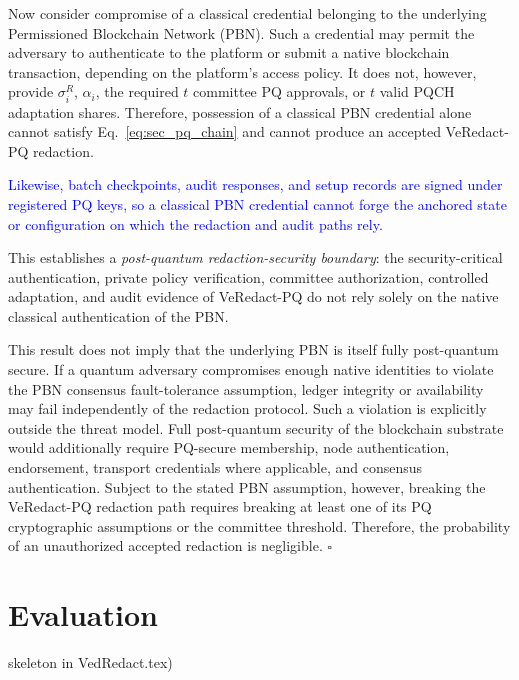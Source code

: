 \documentclass[lettersize,journal]{IEEEtran}
\begin{document}
Now consider compromise of a classical credential belonging to the
underlying Permissioned Blockchain Network (PBN). Such a credential
may permit the adversary to authenticate to the platform or submit a
native blockchain transaction, depending on the platform's access
policy. It does not, however, provide $\sigma_i^R$, $\alpha_i$, the
required $t$ committee PQ approvals, or $t$ valid PQCH adaptation
shares. Therefore, possession of a classical PBN credential alone
cannot satisfy Eq.~\eqref{eq:sec_pq_chain} and cannot produce an
accepted VeRedact-PQ redaction.

\textcolor{blue}{Likewise, batch checkpoints, audit responses, and setup
records are signed under registered PQ keys, so a classical PBN
credential cannot forge the anchored state or configuration on which
the redaction and audit paths rely.}

This establishes a \emph{post-quantum redaction-security boundary}:
the security-critical authentication, private policy verification,
committee authorization, controlled adaptation, and audit evidence
of VeRedact-PQ do not rely solely on the native classical
authentication of the PBN.

This result does not imply that the underlying PBN is itself fully
post-quantum secure. If a quantum adversary compromises enough native
identities to violate the PBN consensus fault-tolerance assumption,
ledger integrity or availability may fail independently of the
redaction protocol. Such a violation is explicitly outside the threat
model. Full post-quantum security of the blockchain substrate would
additionally require PQ-secure membership, node authentication,
endorsement, transport credentials where applicable, and consensus
authentication. Subject to the stated PBN assumption, however,
breaking the VeRedact-PQ redaction path requires breaking at least one
of its PQ cryptographic assumptions or the committee threshold.
Therefore, the probability of an unauthorized accepted redaction is
negligible.
\hfill$\square$




\section{Evaluation} skeleton in VedRedact.tex)
\end{document}
